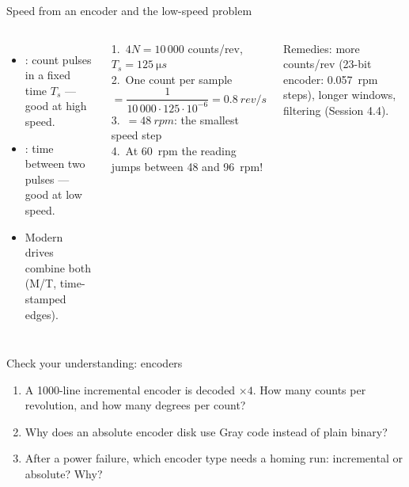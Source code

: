 \documentclass[aspectratio=169,10pt]{beamer}
\begin{document}
\begin{frame}{Speed from an encoder and the low-speed problem}
\begin{columns}[T]
\centering
{}

\vspace{2mm}
\begin{itemize}\small
\item {}: count pulses in a fixed time $T_s$ --- good at high speed.
\item {}: time between two pulses --- good at low speed.
\item Modern drives combine both (M/T, time-stamped edges).
\end{itemize}
\begin{keybox}
\small
1.\ $4N=10\,000$ counts/rev, $T_s=\SI{125}{\micro s}$\\[1mm]
2.\ One count per sample $=\dfrac{1}{10\,000\cdot125\cdot10^{-6}}=\SI{0.8}{rev/s}$\\[1mm]
3.\ $=\SI{48}{rpm}$: the smallest speed step\\[1mm]
4.\ At \SI{60}{rpm} the reading jumps between 48 and \SI{96}{rpm}!
\end{keybox}
\begin{notebox}
\small Remedies: more counts/rev (23-bit encoder: \SI{0.057}{rpm} steps), longer windows, filtering (Session 4.4).
\end{notebox}
\end{columns}
\end{frame}

\begin{frame}{Check your understanding: encoders}
\begin{keybox}
\large
\begin{enumerate}
\item A 1000-line incremental encoder is decoded $\times4$. How many counts per revolution, and how many degrees per count?
\item Why does an absolute encoder disk use Gray code instead of plain binary?
\item After a power failure, which encoder type needs a homing run: incremental or absolute? Why?
\end{enumerate}
\end{keybox}
\end{frame}
\end{document}
